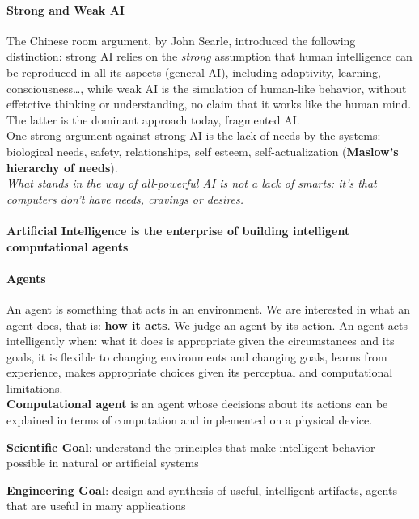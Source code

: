 \documentclass[10pt]{report}
\begin{document}
\paragraph{Strong and Weak AI} The Chinese room argument, by John Searle, introduced the following distinction: strong AI relies on the \textit{strong} assumption that human intelligence can be reproduced in all its aspects (general AI), including adaptivity, learning, consciousness\ldots, while weak AI is the simulation of human-like behavior, without effetctive thinking or understanding, no claim that it works like the human mind. The latter is the dominant approach today, fragmented AI.\\
One strong argument against strong AI is the lack of needs by the systems: biological needs, safety, relationships, self esteem, self-actualization (\textbf{Maslow's hierarchy of needs}).\\
\textit{What stands in the way of all-powerful AI is not a lack of smarts: it's that computers don't have needs, cravings or desires.}\\\\
\textbf{Artificial Intelligence is the enterprise of building intelligent computational agents}
\paragraph{Agents} An agent is something that acts in an environment. We are interested in what an agent does, that is: \textbf{how it acts}. We judge an agent by its action. An agent acts intelligently when: what it does is appropriate given the circumstances and its goals, it is flexible to changing environments and changing goals, learns from experience, makes appropriate choices given its perceptual and computational limitations.\\
\textbf{Computational agent} is an agent whose decisions about its actions can be explained in terms of computation and implemented on a physical device.
\begin{list}{}{}
	\item \textbf{Scientific Goal}: understand the principles that make intelligent behavior possible in natural or artificial systems
	\item \textbf{Engineering Goal}: design and synthesis of useful, intelligent artifacts, agents that are useful in many applications
\end{list}
\end{document}
